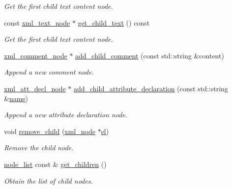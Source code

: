 \begin{DoxyCompactItemize}
\begin{DoxyCompactList}\small\item\em Get the first child text content node. \end{DoxyCompactList}\item 
const \hyperlink{classxml__text__node}{xml\+\_\+text\+\_\+node} $\ast$ \hyperlink{classxml__child_ac5dfa7787308680d0ec0639fd69c3b44}{get\+\_\+child\+\_\+text} () const
\begin{DoxyCompactList}\small\item\em Get the first child text content node. \end{DoxyCompactList}\item 
\hyperlink{classxml__comment__node}{xml\+\_\+comment\+\_\+node} $\ast$ \hyperlink{classxml__child_aaae026d29c248b85de947ba6e86dca12}{add\+\_\+child\+\_\+comment} (const std\+::string \&content)
\begin{DoxyCompactList}\small\item\em Append a new comment node. \end{DoxyCompactList}\item 
\hyperlink{structxml__att__decl__node}{xml\+\_\+att\+\_\+decl\+\_\+node} $\ast$ \hyperlink{classxml__child_abb4569a8a579461161027961c33dc882}{add\+\_\+child\+\_\+attribute\+\_\+declaration} (const std\+::string \&\hyperlink{classxml__node_ae2af9d4ef2a866cdb4497cd6e5c34b7a}{name})
\begin{DoxyCompactList}\small\item\em Append a new attribute declaration node. \end{DoxyCompactList}\item 
void \hyperlink{classxml__child_a78a291f569cf79849dc8b2649fc89608}{remove\+\_\+child} (\hyperlink{classxml__node}{xml\+\_\+node} $\ast$\hyperlink{tutorial__pnnl__2019_2optimizations_2second_2solution_2adpcm_8c_a7f3560d6472f5c36bc6290395fc960f0}{el})
\begin{DoxyCompactList}\small\item\em Remove the child node. \end{DoxyCompactList}\item 
\hyperlink{classxml__node_a4e558f6b9e873e9d0e92cfc8e7880385}{node\+\_\+list} const  \& \hyperlink{classxml__child_ac4b78d575689b828c0859d8f4f02fbac}{get\+\_\+children} ()
\begin{DoxyCompactList}\small\item\em Obtain the list of child nodes. \end{DoxyCompactList}\item 

\end{DoxyCompactItemize}
